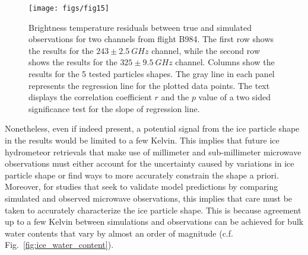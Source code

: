 \documentclass[journal abbreviation, manuscript]{copernicus}
\begin{document}
\begin{figure}[!hbpt]
  \centering
  \texttt{[image: figs/fig15]}
  \caption{
    Brightness temperature residuals between true and simulated observations for
    two channels from flight B984. The first row shows the results for the $243\pm
    2.5\ \unit{GHz}$ channel, while the second row shows the results for the
    $325\pm 9.5\ \unit{GHz}$ channel. Columns show the results for the 5 tested
    particles shapes. The gray line in each panel represents the regression line
    for the plotted data points. The text displays the correlation coefficient
    $r$ and the $p$ value of a two sided significance test for the slope of
    regression line.
  }
  \label{fig:residuals_scatter_b984}
\end{figure}


Nonetheless, even if indeed present, a potential signal from the ice particle
shape in the results would be limited to a few Kelvin. This implies that future
ice hydrometeor retrievals that make use of millimeter and sub-millimeter
microwave observations must either account for the uncertainty caused by
variations in ice particle shape or find ways to more accurately constrain the
shape a priori. Moreover, for studies that seek to validate model predictions by
comparing simulated and observed microwave observations, this implies that care
must be taken to accurately characterize the ice particle shape. This is because
agreement up to a few Kelvin between simulations and observations can be
achieved for bulk water contents that vary by almost an order of magnitude (c.f.
Fig.~\ref{fig:ice_water_content}).
\end{document}
